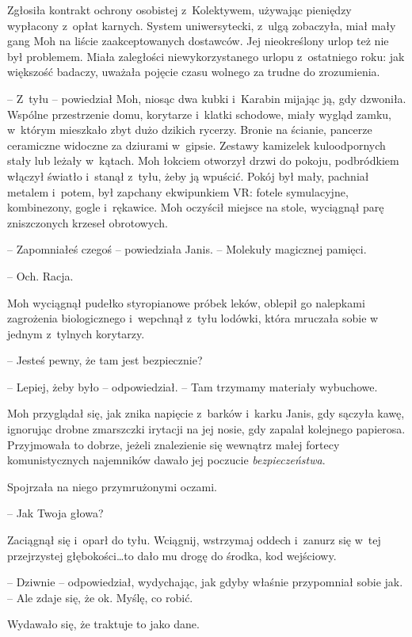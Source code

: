\documentclass[oneside,polish,11pt,sfheadings]{mwbk}
\begin{document}
Zgłosiła kontrakt ochrony osobistej z~Kolektywem, używając pieniędzy
wypłacony z~opłat karnych. System uniwersytecki, z~ulgą zobaczyła, miał
mały gang Moh na liście zaakceptowanych dostawców. Jej nieokreślony
urlop też nie był problemem. Miała zaległości niewykorzystanego urlopu z~ostatniego roku: jak większość badaczy, uważała pojęcie czasu wolnego za
trudne do zrozumienia.

-- Z~tyłu -- powiedział Moh, niosąc dwa kubki i~Karabin mijając ją, gdy
dzwoniła. Wspólne przestrzenie domu, korytarze i~klatki schodowe, miały
wygląd zamku, w~którym mieszkało zbyt dużo dzikich rycerzy. Bronie na
ścianie, pancerze ceramiczne widoczne za dziurami w~gipsie. Zestawy
kamizelek kuloodpornych stały lub leżały w~kątach. Moh łokciem otworzył
drzwi do pokoju, podbródkiem włączył światło i~stanął z~tyłu, żeby ją
wpuścić. Pokój był mały, pachniał metalem i~potem, był zapchany
ekwipunkiem VR: fotele symulacyjne, kombinezony, gogle i~rękawice. Moh
oczyścił miejsce na stole, wyciągnął parę zniszczonych krzeseł
obrotowych.

-- Zapomniałeś czegoś -- powiedziała Janis. -- Molekuły magicznej pamięci.

-- Och. Racja.

Moh wyciągnął pudełko styropianowe próbek leków, oblepił go nalepkami
zagrożenia biologicznego i~wepchnął z~tyłu lodówki, która mruczała sobie
w jednym z~tylnych korytarzy.

-- Jesteś pewny, że tam jest bezpiecznie?

-- Lepiej, żeby było -- odpowiedział. -- Tam trzymamy materiały wybuchowe.

Moh przyglądał się, jak znika napięcie z~barków i~karku Janis, gdy
sączyła kawę, ignorując drobne zmarszczki irytacji na jej nosie, gdy
zapalał kolejnego papierosa. Przyjmowała to dobrze, jeżeli znalezienie
się wewnątrz małej fortecy komunistycznych najemników dawało jej
poczucie \emph{bezpieczeństwa}.

Spojrzała na niego przymrużonymi oczami.

-- Jak Twoja głowa?

Zaciągnął się i~oparł do tyłu. Wciągnij, wstrzymaj oddech i~zanurz się w~tej przejrzystej głębokości\ldots to dało mu drogę do środka, kod
wejściowy.

-- Dziwnie -- odpowiedział, wydychając, jak gdyby właśnie przypomniał
sobie jak. -- Ale zdaje się, że ok. Myślę, co robić.

Wydawało się, że traktuje to jako dane.
\end{document}

